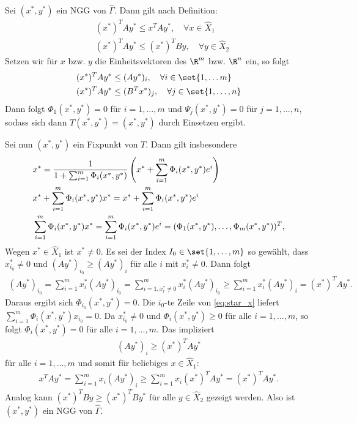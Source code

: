 \begin{beweis}
  Sei $(x^{*}, y^{*})$ ein NGG von $\hat \Gamma$. Dann gilt nach Definition:
  \begin{align*}
    &(x^{*})^{T}A y^{*} \leq x^{T}Ay^{*}, \quad \forall x \in \hat X_{1}\\
    &(x^{*})^{T}A y^{*} \leq (x^{*})^{T}By, \quad \forall y \in \hat X_{2}
  \end{align*}
Setzen wir für $x$ bzw. $y$ die Einheitsvektoren des $\R^{m}$ bzw. $\R^{n}$ ein, so folgt
\begin{align*}
&(x^{*})^{T}A y^{*} \leq (Ay^{*})_{i}, \quad \forall i \in \set{1, \dots m}\\
&(x^{*})^{T}A y^{*} \leq (B^{T}x^{*})_{j}, \quad \forall j \in \set{1, \dots, n}
\end{align*}
Dann folgt $\Phi_{1}(x^{*}, y^{*}) = 0$ für $i = 1,\dots, m$ und $\Psi_{j}(x^{*}, y^{*}) = 0$ für $j = 1, \dots, n$, sodass sich dann $T(x^{*},y^{*}) = (x^{*}, y^{*})$ durch Einsetzen ergibt. 

Sei nun $ (x^{*}, y^{*})$ ein Fixpunkt von $T$. Dann gilt insbesondere
\begin{align}\label{eq:star_x}
&  x^{*} = \frac 1 {1 + \sum_{i = 1}^{m}\Phi_{i}(x^{*}, y^{*})}\left(x^{*} + \sum_{i = 1}^{m}\Phi_{i}(x^{*}, y^{*})e^{i}\right)\notag\\
&x^{*} + \sum_{i = 1}^{m}\Phi_{i}(x^{*}, y^{*})x^{*} =x^{*} + \sum_{i = 1}^{m}\Phi_{i}(x^{*}, y^{*})e^{i}\notag \\
&\sum_{i = 1}^{m}\Phi_{i}(x^{*}, y^{*})x^{*} =\sum_{i = 1}^{m}\Phi_{i}(x^{*}, y^{*})e^{i} = (\Phi_{1}(x^{*}, y^{*}), \dots, \Phi_{m}(x^{*}, y^{*}))^{T}, 
\end{align}
Wegen $x^{*} \in \hat X_{1}$ ist $x^{*} \neq 0$. Es sei der Index $I_{0} \in \set{1, \dots, m}$ so gewählt, dass $x_{i_{0}}^{*} \neq 0$ und $(Ay^{*})_{i_{0}}\geq (Ay^{*})_{i}$ für alle $i$ mit $x^{*}_{i} \neq 0$. Dann folgt
\begin{align*}
  (Ay^{*})_{i_{0}} = \sum_{i = 1}^{m}x_{i}^{*}(Ay^{*})_{i_{0}} = \sum_{i = 1, x_{i}^{*}\neq 0}^{m} x_{i}^{*}(Ay^{*})_{i_{0}} \geq \sum_{i = 1}^{m} x_{i}^{*}(Ay^{*})_{i} = (x^{*})^{T}Ay^{*}.
\end{align*}
Daraus ergibt sich $\Phi_{i_{0}}(x^{*}, y^{*}) = 0$. Die $i_{0}$-te Zeile von \eqref{eq:star_x} liefert $\sum_{i = 1}^{m}\Phi_{i}(x^{*}, y^{*})x_{i_{0}} = 0$. Da $x_{i_{0}}^{*} \neq 0$ und $\Phi_{i}(x^{*}, y^{*})\geq 0$ für alle $i = 1, \dots, m$, so folgt $\Phi_{i}(x^{*}, y^{*}) = 0$ für alle $i = 1, \dots, m$. Das impliziert
\begin{align*}
  (Ay^{*})_{i} \geq (x^{*})^{T}Ay^{*}
\end{align*}
für alle $i = 1, \dots, m$ und somit für beliebiges $x \in \hat X_{1}$:
\begin{align*}
  x^{T}Ay^{*} = \sum_{i = 1}^{m} x_{i}(Ay^{*})_{i}\geq\sum_{i = 1}^{m} x_{i}(x^{*})^{T}Ay^{*} = (x^{*})^{T}Ay^{*}.
\end{align*}
Analog kann $(x^{*})^{T}By \geq (x^{*})^{T}By^{*}$ für alle $y \in \hat X_{2}$ gezeigt werden. Also ist $(x^{*}, y^{*})$ ein NGG von $\hat \Gamma$. 
\end{beweis}
